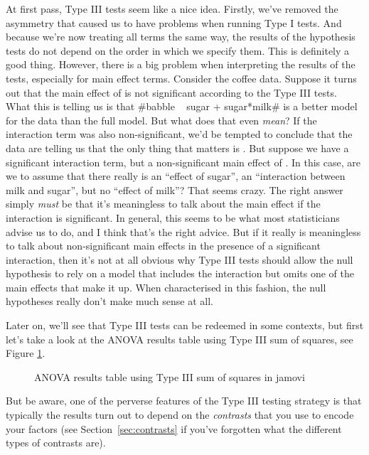 At first pass, Type III tests seem like a nice idea. Firstly, we've removed the asymmetry that caused us to have problems when running Type I tests. And because we're now treating all terms the same way, the results of the hypothesis tests do not depend on the order in which we specify them. This is definitely a good thing. However, there is a big problem when interpreting the results of the tests, especially for main effect terms. Consider the coffee data. Suppose it turns out that the main effect of  is not significant according to the Type III tests. What this is telling us is that \rtextverb#babble ~ sugar + sugar*milk# is a better model for the data than the full model. But what does that even {\it mean}? If the interaction term  was also non-significant, we'd be tempted to conclude that the data are telling us that the only thing that matters is . But suppose we have a significant interaction term, but a non-significant main effect of . In this case, are we to assume that there really is an ``effect of sugar'', an ``interaction between milk and sugar'', but no ``effect of milk''? That seems crazy. The right answer simply {\it must} be that it's meaningless to talk about the main effect if the interaction is significant. In general, this seems to be what most statisticians advise us to do, and I think that's the right advice. But if it really is meaningless to talk about non-significant main effects in the presence of a significant interaction, then it's not at all obvious why Type III tests should allow the null hypothesis to rely on a model that includes the interaction but omits one of the main effects that make it up. When characterised in this fashion, the null hypotheses really don't make much sense at all. 

Later on, we'll see that Type III tests can be redeemed in some contexts, but first let's take a look at the ANOVA results table using Type III sum of squares, see Figure \ref{fig:factorialanova18}.

\begin{figure}[!htb]
\begin{center}
\caption{ANOVA results table using Type III sum of squares in jamovi}
\label{fig:factorialanova18}
\HR
\end{center}
\end{figure}

But be aware, one of the perverse features of the Type III testing strategy is that typically the results turn out to depend on the {\it contrasts} that you use to encode your factors (see Section~\ref{sec:contrasts} if you've forgotten what the different types of contrasts are).

